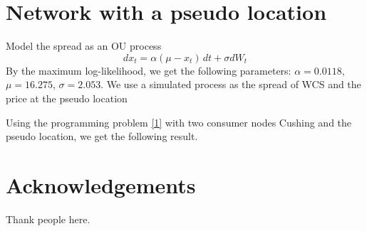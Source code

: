 \documentclass[11pt]{m2pi}
\begin{document}
\section{Network with a pseudo location}
Model the spread as an OU process
\[dx_t  = \alpha(\mu-x_t)\,dt + \sigma dW_t\]
By the maximum log-likelihood, we get the following parameters:  $\alpha=0.0118$,$\mu=16.275$, $\sigma=2.053$.
We use a simulated process as the spread of WCS and the price at the pseudo location


Using the programming problem \eqref{1} with two consumer nodes Cushing and the pseudo location, we get the following result.

\section{Acknowledgements}
Thank people here.



\end{document}
